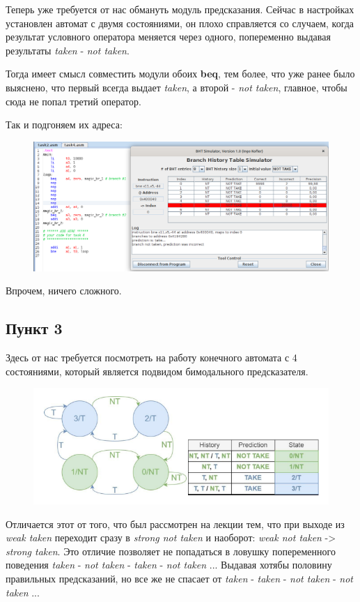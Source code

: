 Теперь уже требуется от нас обмануть модуль предсказания. Сейчас в настройках установлен автомат с двумя состояниями, он плохо справляется со случаем, когда результат условного оператора меняется через одного, попеременно выдавая результаты \textit{taken} - \textit{not taken}.

Тогда имеет смысл совместить модули обоих \textbf{beq}, тем более, что уже ранее было выяснено, что первый всегда выдает \textit{taken}, а второй - \textit{not taken}, главное, чтобы сюда не попал третий оператор.

Так и подгоняем их адреса:

\begin{figure}[H]
    \centering
    \includegraphics[width=1\linewidth]{Part2/task2.png}
\end{figure}

Впрочем, ничего сложного.
\subsection*{Пункт 3}

Здесь от нас требуется посмотреть на работу конечного автомата с 4 состояниями, который является подвидом бимодального предсказателя.
\begin{figure}[H]
    \centering
    \includegraphics[width=0.75\linewidth]{Part3/bimodal.png}
\end{figure}

Отличается этот от того, что был рассмотрен на лекции тем, что при выходе из \textit{weak taken} переходит сразу в \textit{strong not taken} и наоборот: \textit{weak not taken} -> \textit{strong taken}. Это отличие позволяет не попадаться в ловушку попеременного поведения \textit{taken} - \textit{not taken} - \textit{taken} - \textit{not taken} ...
Выдавая хотябы половину правильных предсказаний, но все же не спасает от \textit{taken} - \textit{taken} - \textit{not taken} - \textit{not taken} ...

